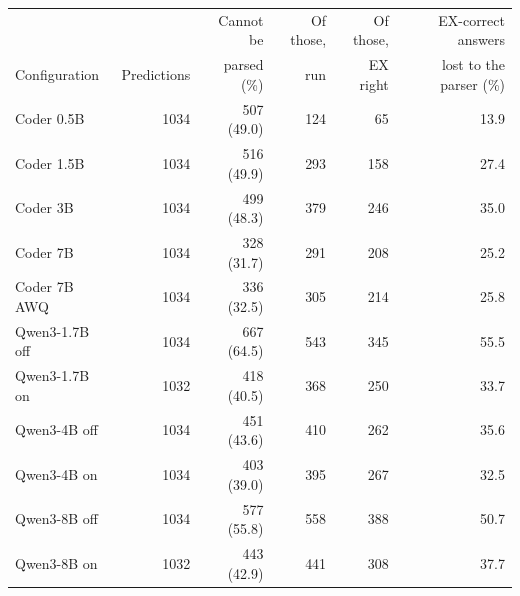 \begin{tabular}{@{}l rrrrr@{}}
\toprule
 & & Cannot be & Of those, & Of those, & EX-correct answers \\
Configuration & Predictions & parsed (\%) & run & EX right & lost to the parser (\%) \\
\midrule
Coder 0.5B & 1034 & 507 (49.0) & 124 & 65 & 13.9 \\
Coder 1.5B & 1034 & 516 (49.9) & 293 & 158 & 27.4 \\
Coder 3B & 1034 & 499 (48.3) & 379 & 246 & 35.0 \\
Coder 7B & 1034 & 328 (31.7) & 291 & 208 & 25.2 \\
Coder 7B AWQ & 1034 & 336 (32.5) & 305 & 214 & 25.8 \\
\midrule
Qwen3-1.7B off & 1034 & 667 (64.5) & 543 & 345 & 55.5 \\
Qwen3-1.7B on & 1032 & 418 (40.5) & 368 & 250 & 33.7 \\
Qwen3-4B off & 1034 & 451 (43.6) & 410 & 262 & 35.6 \\
Qwen3-4B on & 1034 & 403 (39.0) & 395 & 267 & 32.5 \\
Qwen3-8B off & 1034 & 577 (55.8) & 558 & 388 & 50.7 \\
Qwen3-8B on & 1032 & 443 (42.9) & 441 & 308 & 37.7 \\
\bottomrule
\end{tabular}
